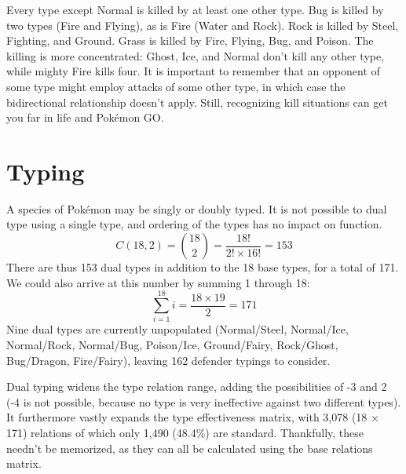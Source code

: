 %
Every type except Normal is killed by at least one other type.
Bug is killed by two types (Fire and Flying), as is Fire (Water and Rock).
Rock is killed by Steel, Fighting, and Ground.
Grass is killed by Fire, Flying, Bug, and Poison.
The killing is more concentrated: Ghost, Ice, and Normal don't kill
  any other type, while mighty Fire kills four.
It is important to remember that an opponent of some type might
  employ attacks of some other type, in which case the bidirectional
  relationship doesn't apply.
Still, recognizing kill situations can get you
  far in life and Pokémon GO\@.

\section{Typing}
\label{sec:dualtypes}
A species of Pokémon may be singly or doubly typed.
It is not possible to dual type using a single type, and ordering of the types has no impact on function.
\[ C(18, 2) = \binom{18}{2} = \frac{18!}{2! \times 16!} = 153 \]
There are thus 153 dual types in addition to the 18 base types, for a total of 171.
We could also arrive at this number by summing 1 through 18:
\[ \sum_{i=1}^{18} i = \frac{18 \times 19}{2} = 171 \]
Nine dual types are currently unpopulated (Normal/Steel, Normal/Ice, Normal/Rock,
 Normal/Bug, Poison/Ice, Ground/Fairy, Rock/Ghost, Bug/Dragon, Fire/Fairy),
 leaving 162 defender typings to consider.

Dual typing widens the type relation range, adding the possibilities
 of -3 and 2 (-4 is not possible, because no type is very ineffective against
 two different types).
It furthermore vastly expands the type effectiveness matrix,
 with 3,078 (18 × 171) relations of which only 1,490 (48.4\%) are standard.
Thankfully, these needn't be memorized, as they can all be calculated
 using the base relations matrix.

